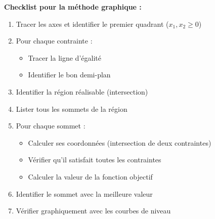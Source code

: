 \documentclass[12pt,a4paper]{article}
\begin{document}
\begin{methode}
\textbf{Checklist pour la méthode graphique :}

\begin{enumerate}
    \item[$\square$] Tracer les axes et identifier le premier quadrant ($x_1, x_2 \geq 0$)
    \item[$\square$] Pour chaque contrainte :
    \begin{itemize}
        \item[$\square$] Tracer la ligne d'égalité
        \item[$\square$] Identifier le bon demi-plan
    \end{itemize}
    \item[$\square$] Identifier la région réalisable (intersection)
    \item[$\square$] Lister tous les sommets de la région
    \item[$\square$] Pour chaque sommet :
    \begin{itemize}
        \item[$\square$] Calculer ses coordonnées (intersection de deux contraintes)
        \item[$\square$] Vérifier qu'il satisfait toutes les contraintes
        \item[$\square$] Calculer la valeur de la fonction objectif
    \end{itemize}
    \item[$\square$] Identifier le sommet avec la meilleure valeur
    \item[$\square$] Vérifier graphiquement avec les courbes de niveau
\end{enumerate}
\end{methode}
\end{document}
